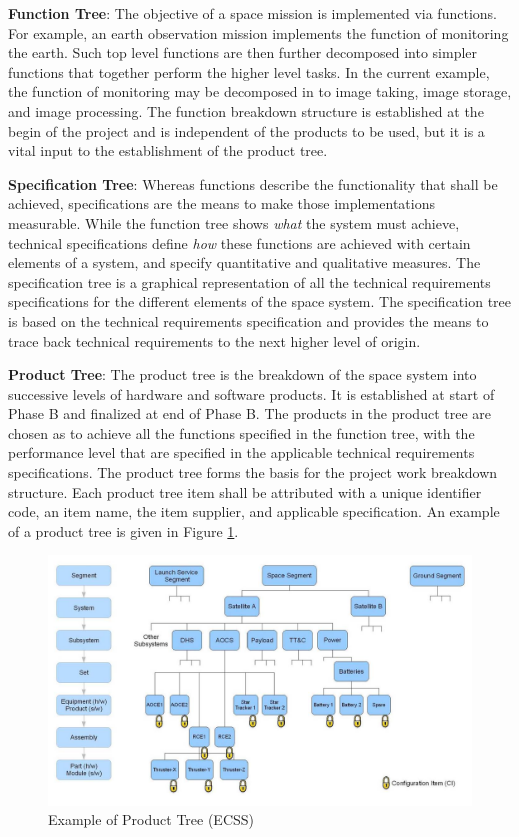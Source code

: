 \textbf{Function Tree}: The objective of a space mission is implemented via functions. For example, an earth observation mission implements the function of monitoring the earth. Such top level functions are then further decomposed into simpler functions that together perform the higher level tasks. In the current example, the function of monitoring may be decomposed in to image taking, image storage, and image processing. The function breakdown structure is established at the begin of the project and is independent of the products to be used, but it is a vital input to the establishment of the product tree. 

\textbf{Specification Tree}: Whereas functions describe the functionality that shall be achieved, specifications are the means to make those implementations measurable. While the function tree shows \textit{what} the system must achieve, technical specifications define \textit{how} these functions are achieved with certain elements of a system, and specify quantitative and qualitative measures. The specification tree is a graphical representation of all the technical requirements specifications for the different elements of the space system.  The specification tree is based on the technical requirements specification and provides the means to trace back technical requirements to the next higher level of origin. 

\textbf{Product Tree}: The product tree is the breakdown of the space system into successive levels of hardware and software products. It is established at start of Phase B and finalized at end of Phase B. The products in the product tree are chosen as to achieve all the functions specified in the function tree, with the performance level that are specified in the applicable technical requirements specifications. The product tree forms the basis for the project work breakdown structure. Each product tree item shall be attributed with a unique identifier code, an item name, the item supplier, and applicable specification. An example of a product tree is given in Figure \ref{fig:Example of Product Tree}. 

\begin{figure}[h]
\centering\includegraphics[scale=0.3]{fig/example_of_product_tree}
\caption{Example of Product Tree (ECSS)}
\label{fig:Example of Product Tree}
\end{figure}

